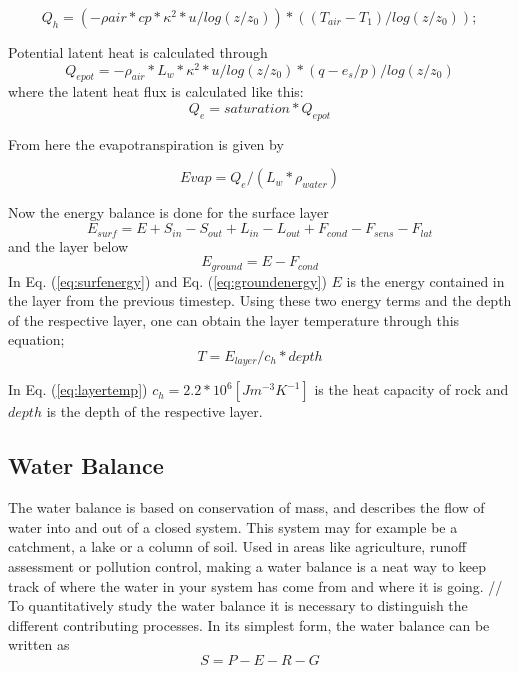 \documentclass[a4paper,11pt,twocolumn]{article}
\begin{document}
\begin{equation}
Q_h = (-\rho{air}*cp*\kappa^2*u/log(z/z_0))*((T_{air}-T_1)/log(z/z_0));
\end{equation}

Potential latent heat is calculated through 
\begin{equation}
Q_{e pot} = -\rho_{air}*L_w*\kappa^2*u/log(z/z_0)*(q-e_s/p)/log(z/z_0)
\end{equation}
where the latent heat flux is calculated like this:
\begin{equation}
Q_e = saturation*Q_{e pot}
\end{equation}

From here the evapotranspiration is given by 

\begin{equation}
Evap = Q_e/(L_w*\rho_{water})
\end{equation}

Now the energy balance is done for the surface layer  
\begin{equation}
	E_{surf} = E + S_{in}-S_{out}+L_{in}-L_{out}+F_{cond}-F_{sens}-F_{lat}
	\label{eq:surfenergy}
\end{equation}
and the layer below
\begin{equation}
E_{ground} = E-F_{cond}
	\label{eq:groundenergy}
\end{equation}
In Eq. (\ref{eq:surfenergy}) and Eq. (\ref{eq:groundenergy}) $E$ is the energy contained in the layer from the previous timestep. Using these two energy terms and the depth of the respective layer, one can obtain the layer temperature through this equation;
\begin{equation}
	T = E_{layer}/c_h*depth
	\label{eq:layertemp}
\end{equation}

In Eq. (\ref{eq:layertemp}) $c_h = 2.2*10^6 [Jm^{-3}K^{-1}]$ is the heat capacity of rock and $depth$ is the depth of the respective layer.   


\subsection{Water Balance}
The water balance is based on conservation of mass, and describes the flow of water into and out of a closed system. This system may for example be a catchment, a lake or a column of soil. Used in areas like agriculture, runoff assessment or pollution control, making a water balance is a neat way to keep track of where the water in your system has come from and where it is going.  
//
To quantitatively study the water balance it is necessary to distinguish the different contributing processes. In its simplest form, the water balance can be written as \cite{dingman} 
\begin{equation}
	S = P - E - R - G 
	\label{eq:waterbalance}
\end{equation}
\end{document}
